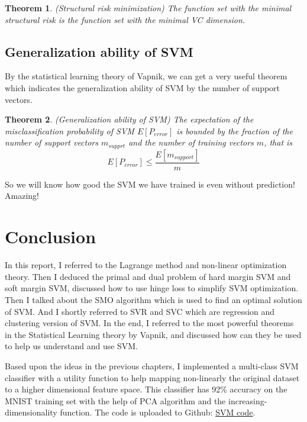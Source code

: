 \documentclass[a4paper]{report}
\newtheorem{theorem}{Theorem}[section]
\begin{document}
\begin{theorem}
    (Structural risk minimization) The function set with the minimal structural risk is the function set with the minimal VC dimension.
\end{theorem}

\section{Generalization ability of SVM}

By the statistical learning theory of Vapnik, we can get a very useful theorem which indicates the generalization ability of SVM by the number of support vectors.

\begin{theorem}
    (Generalization ability of SVM\cite{cortes1995support}) The expectation of the misclassification probability of SVM $E[P_{error}]$ is bounded by the fraction of the number of support vectors $m_{supprt}$ and the number of training vectors $m$, that is
    \[
        E[P_{error}]\leq\frac{E[m_{support}]}{m}
    \]
\end{theorem}

So we will know how good the SVM we have trained is even without prediction! Amazing!

\chapter{Conclusion}

In this report, I referred to the Lagrange method and non-linear optimization theory. Then I deduced the primal and dual problem of hard margin SVM and soft margin SVM, discussed how to use hinge loss to simplify SVM optimization. Then I talked about the SMO algorithm which is used to find an optimal solution of SVM. And I shortly referred to SVR and SVC which are regression and clustering version of SVM. In the end, I referred to the most powerful theorems in the Statistical
Learning theory by Vapnik, and discussed how can they be used to help us understand and use SVM. 

Based upon the ideas in the previous chapters, I implemented a multi-class SVM classifier with a utility function to help mapping non-linearly the original dataset to a higher dimensional feature space. This classifier has 92\% accuracy on the MNIST training set with the help of PCA algorithm and the increasing-dimensionality function. The code is uploaded to Github: \href{https://github.com/chaihahaha/Multiclass-Support-Vector-Machine-Tensorflow}{SVM code}.

{}

\end{document}
